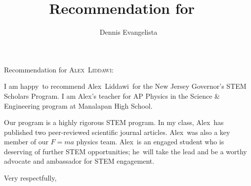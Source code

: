 \documentclass[10pt]{letter}
\title{Recommendation for \firstname\ \lastname}
\author{Dennis Evangelista}
\date{}
\newcommand\firstname{Alex}
\newcommand\lastname{Liddawi}
\newcommand\subject{he}
\newcommand\adjective{happy}
\begin{document}
\begin{letter}{%
}

\opening{Recommendation for {\scshape\firstname\ \lastname}:}

I am \adjective\ to recommend \firstname\ \lastname\ for the New Jersey Governor's STEM Scholars Program.  I am \firstname's teacher for AP Physics in the Science \& Engineering program at Manalapan High School. 

Our program is a highly rigorous STEM program. In my class, \firstname\ has published two peer-reviewed scientific journal articles.  \firstname\ was also a key member of our $F=ma$ physics team. \firstname\ is an engaged student who is deserving of further STEM opportunities; \subject\ will take the lead and be a worthy advocate and ambassador for STEM engagement. 


\closing{Very respectfully,}

\end{letter}
\end{document}
